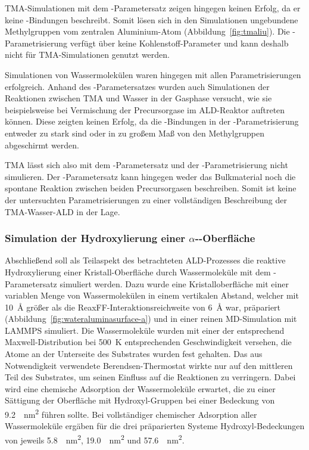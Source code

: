 TMA-Simulationen mit dem -Parametersatz zeigen hingegen keinen Erfolg, da er keine -Bindungen beschreibt.
Somit lösen sich in den Simulationen ungebundene Methylgruppen vom zentralen Aluminium-Atom (Abbildung~\ref{fig:tmaliu}).
Die -Parametrisierung verfügt über keine Kohlenstoff-Parameter und kann deshalb nicht für TMA-Simulationen genutzt werden.

Simulationen von Wassermolekülen waren hingegen mit allen Parametrisierungen erfolgreich.
Anhand des -Parametersatzes wurden auch Simulationen der Reaktionen zwischen TMA und Wasser in der Gasphase versucht, wie sie beispielsweise bei Vermischung der Precursorgase im ALD-Reaktor auftreten können.
Diese zeigten keinen Erfolg, da die -Bindungen in der -Parametrisierung entweder zu stark sind oder in zu großem Maß von den Methylgruppen abgeschirmt werden.

TMA lässt sich also mit dem -Parametersatz und der -Parametrisierung nicht simulieren.
Der -Parametersatz kann hingegen weder das Bulkmaterial noch die spontane Reaktion zwischen beiden Precursorgasen beschreiben.
Somit ist keine der untersuchten Parametrisierungen zu einer vollständigen Beschreibung der TMA-Wasser-ALD in der Lage.

\subsubsection{Simulation der Hydroxylierung einer \texorpdfstring{$\alpha$-}{alpha-Al2O3}-Oberfläche}

Abschließend soll als Teilaspekt des betrachteten ALD-Prozesses die reaktive Hydroxylierung einer Kristall-Oberfläche durch Wassermoleküle mit dem -Parametersatz simuliert werden.
Dazu wurde eine Kristalloberfläche mit einer variablen Menge von Wassermolekülen in einem vertikalen Abstand, welcher mit \SI{10}{\angstrom} größer als die ReaxFF-Inter\-aktions\-reich\-weite von \SI{6}{\angstrom} war, präpariert (Abbildung~\ref{fig:wateraluminasurface-a}) und in einer reinen MD-Simulation mit LAMMPS simuliert.
Die Wassermoleküle wurden mit einer der entsprechend Maxwell-Distribution bei \SI{500}{\kelvin} entsprechenden Geschwindigkeit versehen, die Atome an der Unterseite des Substrates wurden fest gehalten.
Das aus Notwendigkeit verwendete Berendsen-Thermostat wirkte nur auf den mittleren Teil des Substrates, um seinen Einfluss auf die Reaktionen zu verringern.
Dabei wird eine chemische Adsorption der Wassermoleküle erwartet\cite{shapovalov_ab_2000}, die zu einer Sättigung der Oberfläche mit Hydroxyl-Gruppen bei einer Bedeckung von \SI{9.2}{\per\square\nano\meter}\cite{kim_energy_2011} führen sollte.
Bei vollständiger chemischer Adsorption aller Wassermoleküle ergäben für die drei präparierten Systeme Hydroxyl-Bedeckungen von jeweils \SI{5.8}{\per\square\nano\meter}, \SI{19.0}{\per\square\nano\meter} und \SI{57.6}{\per\square\nano\meter}.

